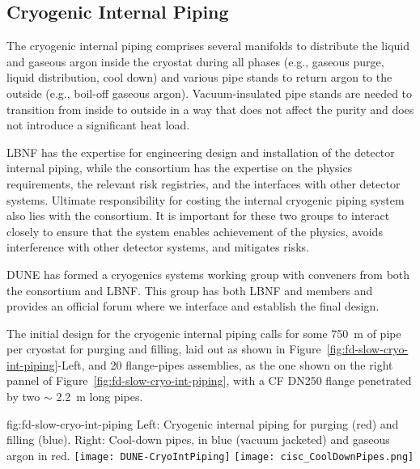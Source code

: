 \subsection{Cryogenic Internal Piping}
\label{sec:fdgen-slow-cryo-int-piping}
\label{sec:fdsp-slow-cryo-int-piping}
\label{sec:fddp-slow-cryo-int-piping}


The cryogenic internal piping comprises several manifolds to
distribute the liquid and gaseous argon inside the cryostat during all
phases (e.g., gaseous purge, liquid distribution, cool down) and
various pipe stands to return argon to the outside (e.g.,
boil-off gaseous argon).  Vacuum-insulated pipe stands are needed to
transition from inside to outside in a way that does not affect the
purity and does not introduce a significant heat load.

LBNF has the expertise for engineering design and installation of the
detector internal piping, while the  consortium has the expertise
on the physics requirements, the relevant risk registries, and the
interfaces with other detector systems. Ultimate responsibility for
costing the internal cryogenic piping system also lies with the 
consortium. It is important for these two groups to interact closely
to ensure that the system enables achievement of the physics, %
avoids interference with other detector systems, and mitigates
risks.

DUNE has formed a cryogenics systems working group with conveners from
both the  consortium and LBNF. This group has both LBNF and
 members and provides an official forum where we interface and
establish the final design.

The initial design for the cryogenic internal piping calls for some
\SI{750}{m} of pipe per cryostat for purging and filling, laid out as
shown in Figure~\ref{fig:fd-slow-cryo-int-piping}-Left, and 20 flange-pipes assemblies, as the one shown
on the right pannel of Figure~\ref{fig:fd-slow-cryo-int-piping}, with a CF DN250 flange penetrated by two $\sim$ \SI{2.2}{m} long pipes.

\begin{dunefigure}{fig:fd-slow-cryo-int-piping}
  {Left: Cryogenic internal piping for purging (red) and filling (blue). Right: Cool-down pipes, \lar in blue (vacuum jacketed) and gaseous argon in red. }
  \texttt{[image: DUNE-CryoIntPiping]}
  \texttt{[image: cisc\_CoolDownPipes.png]}
\end{dunefigure}



